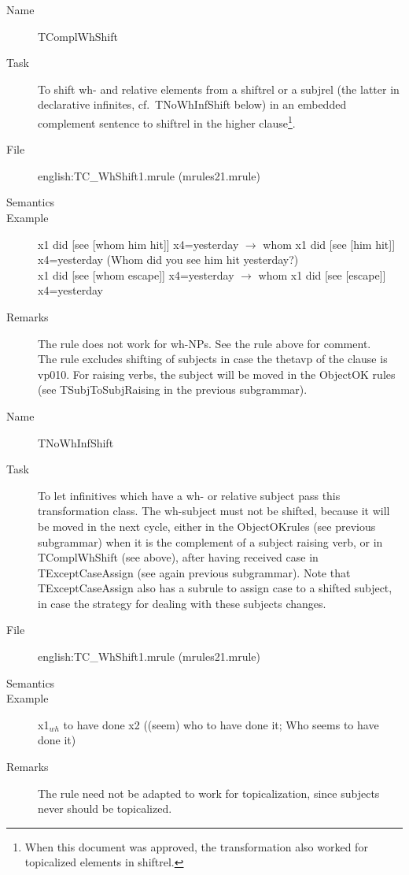 \begin{description}
\vspace{1 cm}
\begin{description}
\item[Name] TComplWhShift
\item[Task] To shift wh- and relative elements from a shiftrel or a subjrel 
(the latter in declarative infinites, cf.\ TNoWhInfShift below) in an embedded
complement sentence to shiftrel in the higher clause\footnote{When 
this document was 
approved, the transformation also worked for topicalized elements in shiftrel.}.
\item[File] english:TC\_WhShift1.mrule (mrules21.mrule)
\item[Semantics]
\item[Example] x1 did [see [whom him hit]] x4=yesterday $\rightarrow$ whom x1 
did [see [him hit]] x4=yesterday (Whom did you see him hit yesterday?)\\
x1 did [see [whom escape]] x4=yesterday $\rightarrow$ whom x1 did [see 
[escape]] x4=yesterday
\item[Remarks] The rule does not work for wh-NPs. See the rule above for 
comment.\\
The rule excludes shifting of subjects in case the thetavp of the clause is 
vp010. For raising verbs, the subject will be moved in the ObjectOK rules (see 
TSubjToSubjRaising in the previous subgrammar).
\end{description}

\vspace{1 cm}
\begin{description}
\item[Name] TNoWhInfShift
\item[Task] To let infinitives which have a wh- or relative subject pass 
this transformation 
class. The wh-subject must not be shifted, because it will be moved in the next 
cycle, either in the ObjectOKrules (see previous subgrammar) when it is the 
complement of a subject raising verb, or in TComplWhShift (see above), after 
having received case in TExceptCaseAssign (see again previous subgrammar). Note 
that TExceptCaseAssign also has a subrule to assign case to a shifted subject, 
in case the strategy for dealing with these subjects changes.
\item[File] english:TC\_WhShift1.mrule (mrules21.mrule)
\item[Semantics]
\item[Example] x1$_{wh}$ to have done x2 ((seem) who to have done it; Who seems 
to have done it)
\item[Remarks] The rule need not be adapted to work for topicalization, 
since subjects never should be topicalized.
\end{description}


\end{description}
